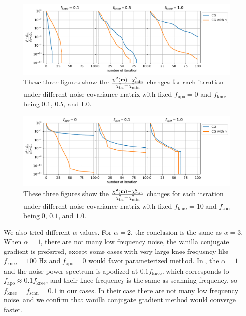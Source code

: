 \documentclass[twocolumn,linenumbers]{aastex631}
\newcommand{\vbm}{\vb{m}}
\begin{document}
\begin{figure}[htb!]
\centering
\includegraphics[width=\textwidth]{pink_noise_chi2.pdf}
\caption{These three figures show the 
$\frac{\chi^2(\vbm) - \chi^2_\text{min}}{\chi^2_\text{ini} - \chi^2_\text{min}}$
changes for each iteration under different noise covariance matrix with
fixed $f_\text{apo}=0$ and $f_\text{knee}$ being $0.1$, $0.5$, and $1.0$.
}
\label{1/f noise chi2}
\end{figure}

\begin{figure}[htb!]
\centering
\includegraphics[width=\textwidth]{apodized_noise_chi2.pdf}
\caption{These three figures show the 
$\frac{\chi^2(\vbm) - \chi^2_\text{min}}{\chi^2_\text{ini} - \chi^2_\text{min}}$
changes for each iteration under different noise covariance matrix with
fixed $f_\text{knee}=10$ and $f_\text{apo}$ being $0$, $0.1$, and $1.0$.
}
\label{apo noise chi2}
\end{figure}

We also tried different $\alpha$ values. For $\alpha=2$, the conclusion is the
same as $\alpha=3$. When $\alpha=1$, there are not many low frequency noise, 
the vanilla conjugate gradient is preferred, except some cases with very large
knee frequency like $f_\text{knee} = 100$ Hz and $f_\text{apo}=0$ would favor
parameterized method.
In \citealt{2018A&A...620A..59P}, the $\alpha = 1$ and  the noise power spectrum is apodized at $0.1f_\text{knee}$,
which corresponds to $f_\text{apo} \approx 0.1 f_\text{knee}$,
and their knee frequency is the same as scanning frequency, so $f_\text{knee}=f_\text{scan}=0.1$ 
in our cases.
In their case there are not many low frequency noise,
and we confirm that vanilla conjugate gradient method would converge faster.
\end{document}
